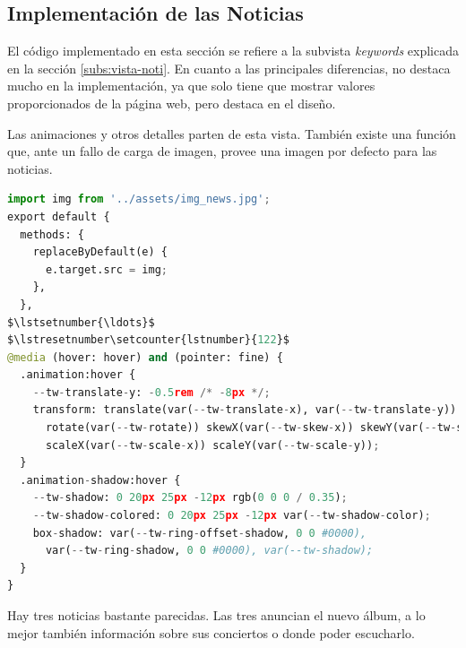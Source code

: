 \subsection{Implementación de las Noticias}
El código implementado en esta sección se refiere a la subvista \textit{keywords} explicada en la sección \ref{subs:vista-noti}. En cuanto a las principales diferencias, no destaca mucho en la implementación, ya que solo tiene que mostrar valores proporcionados de la página web, pero destaca en el diseño.

\vspace{0.3cm}

Las animaciones y otros detalles parten de esta vista. También existe una función que, ante un fallo de carga de imagen, provee una imagen por defecto para las noticias.


\vspace{0.3cm}

\begin{lstlisting}[caption=Diferencias destacables de la implementación de los sentimientos,language=Python, mathescape=true]
import img from '../assets/img_news.jpg';
export default {
  methods: {
    replaceByDefault(e) {
      e.target.src = img;
    },
  },
$\lstsetnumber{\ldots}$
$\lstresetnumber\setcounter{lstnumber}{122}$
@media (hover: hover) and (pointer: fine) {
  .animation:hover {
    --tw-translate-y: -0.5rem /* -8px */;
    transform: translate(var(--tw-translate-x), var(--tw-translate-y))
      rotate(var(--tw-rotate)) skewX(var(--tw-skew-x)) skewY(var(--tw-skew-y))
      scaleX(var(--tw-scale-x)) scaleY(var(--tw-scale-y));
  }
  .animation-shadow:hover {
    --tw-shadow: 0 20px 25px -12px rgb(0 0 0 / 0.35);
    --tw-shadow-colored: 0 20px 25px -12px var(--tw-shadow-color);
    box-shadow: var(--tw-ring-offset-shadow, 0 0 #0000),
      var(--tw-ring-shadow, 0 0 #0000), var(--tw-shadow);
  }
}
\end{lstlisting}

Hay tres noticias bastante parecidas. Las tres anuncian el nuevo álbum, a lo mejor también información sobre sus conciertos o donde poder escucharlo.


